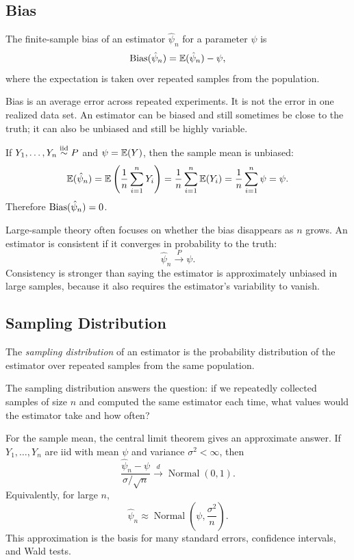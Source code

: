 \subsection{Bias}

\begin{definition}[Bias]
The finite-sample bias of an estimator $\hat\psi_n$ for a parameter $\psi$ is
\[
\operatorname{Bias}(\hat\psi_n)=\mathbb{E}(\hat\psi_n)-\psi,
\]
where the expectation is taken over repeated samples from the population.
\end{definition}

Bias is an average error across repeated experiments. It is not the error in one realized data set. An estimator can be biased and still sometimes be close to the truth; it can also be unbiased and still be highly variable.

\begin{example}
If $Y_1,\ldots,Y_n \overset{\mathrm{iid}}{\sim} P$ and $\psi=\mathbb{E}(Y)$, then the sample mean is unbiased:
\[
\mathbb{E}(\hat\psi_n)
=\mathbb{E}\left(\frac{1}{n}\sum_{i=1}^nY_i\right)
=\frac{1}{n}\sum_{i=1}^n\mathbb{E}(Y_i)
=\frac{1}{n}\sum_{i=1}^n\psi
=\psi.
\]
Therefore $\operatorname{Bias}(\hat\psi_n)=0$.
\end{example}

Large-sample theory often focuses on whether the bias disappears as $n$ grows. An estimator is consistent if it converges in probability to the truth:
\[
\hat\psi_n \overset{P}{\longrightarrow} \psi.
\]
Consistency is stronger than saying the estimator is approximately unbiased in large samples, because it also requires the estimator's variability to vanish.

\subsection{Sampling Distribution}

\begin{definition}
The \emph{sampling distribution} of an estimator is the probability distribution of the estimator over repeated samples from the same population.
\end{definition}

The sampling distribution answers the question: if we repeatedly collected samples of size $n$ and computed the same estimator each time, what values would the estimator take and how often?

For the sample mean, the central limit theorem gives an approximate answer. If $Y_1,\ldots,Y_n$ are iid with mean $\psi$ and variance $\sigma^2<\infty$, then
\[
\frac{\hat\psi_n-\psi}{\sigma/\sqrt n}
\overset{d}{\longrightarrow}
\operatorname{Normal}(0,1).
\]
Equivalently, for large $n$,
\[
\hat\psi_n \approx \operatorname{Normal}\left(\psi,\frac{\sigma^2}{n}\right).
\]
This approximation is the basis for many standard errors, confidence intervals, and Wald tests.

